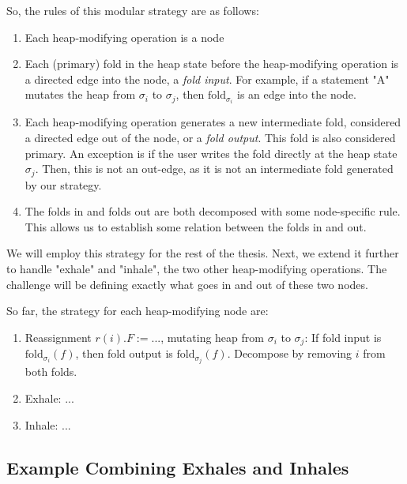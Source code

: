 \documentclass[msc,oneside]{ubcthesis}
\begin{document}
So, the rules of this modular strategy are as follows:
\begin{enumerate}
    \item Each heap-modifying operation is a node
    \item Each (primary) fold in the heap state before the heap-modifying operation is a directed edge into the node, a  \emph{fold input}. For example, if a statement "A" mutates the heap from $\sigma_i$ to $\sigma_j$, then $\textrm{fold}_{\sigma_i}$ is an edge into the node.
    \item Each heap-modifying operation generates a new intermediate fold, considered a directed edge out of the node, or a \emph{fold output}. This fold is also considered primary. An exception is if the user writes the fold directly at the heap state $\sigma_j$. Then, this is not an out-edge, as it is not an intermediate fold generated by our strategy.
    \item The folds in and folds out are both decomposed with some node-specific rule. This allows us to establish some relation between the folds in and out.
\end{enumerate}

We will employ this strategy for the rest of the thesis. Next, we extend it further to handle "exhale" and "inhale", the two other heap-modifying operations. The challenge will be defining exactly what goes in and out of these two nodes.

So far, the strategy for each heap-modifying node are:
\begin{enumerate}
    \item Reassignment $r(i).F := ...$, mutating heap from $\sigma_i$ to $\sigma_j$: 
    If fold input is $\textrm{fold}_{\sigma_i}(f)$, then fold output is $\textrm{fold}_{\sigma_j}(f)$. 
    Decompose by removing $i$ from both folds.
    \item Exhale: ...
    \item Inhale: ...
\end{enumerate}

\subsection{Example Combining Exhales and Inhales}
\end{document}
